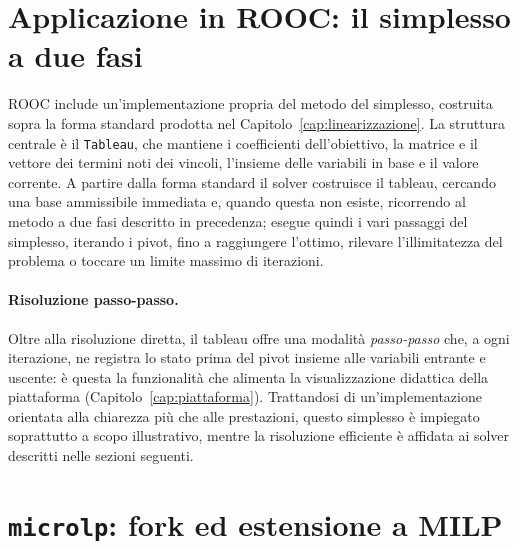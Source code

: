 \section{Applicazione in ROOC: il simplesso a due fasi}
\label{sec:simplex}

ROOC include un'implementazione propria del metodo del simplesso, costruita sopra
la forma standard prodotta nel Capitolo~\ref{cap:linearizzazione}. La struttura
centrale è il \texttt{Tableau}, che mantiene i coefficienti dell'obiettivo, la
matrice e il vettore dei termini noti dei vincoli, l'insieme delle variabili in
base e il valore corrente. A partire dalla forma standard il solver costruisce il
tableau, cercando una base ammissibile immediata e, quando questa non esiste,
ricorrendo al metodo a due fasi descritto in precedenza; esegue quindi i vari
passaggi del simplesso, iterando i pivot, fino a raggiungere l'ottimo, rilevare
l'illimitatezza del problema o toccare un limite massimo di iterazioni.

\paragraph{Risoluzione passo-passo.}
Oltre alla risoluzione diretta, il tableau offre una modalità \emph{passo-passo}
che, a ogni iterazione, ne registra lo stato prima del pivot insieme alle
variabili entrante e uscente: è questa la funzionalità che alimenta la
visualizzazione didattica della piattaforma (Capitolo~\ref{cap:piattaforma}).
Trattandosi di un'implementazione orientata alla chiarezza più che alle
prestazioni, questo simplesso è impiegato soprattutto a scopo illustrativo, mentre
la risoluzione efficiente è affidata ai solver descritti nelle sezioni seguenti.

\section{\texttt{microlp}: fork ed estensione a MILP}
\label{sec:microlp}

